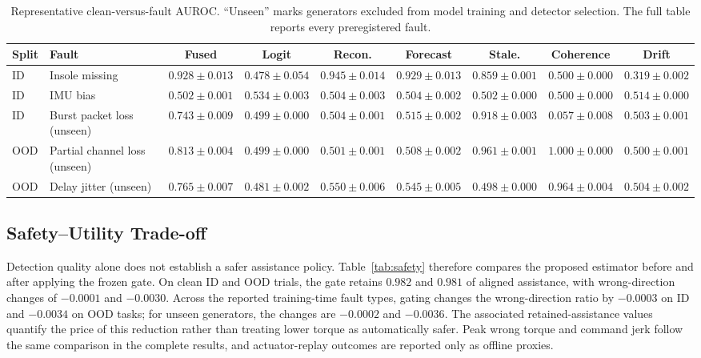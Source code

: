 \documentclass[letterpaper]{article} %
\begin{document}
\begin{table}[t]
\centering
\scriptsize
\setlength{\tabcolsep}{4pt}
\begin{tabular}{llccccccc}
\toprule
Split & Fault & Fused & Logit & Recon. & Forecast & Stale. & Coherence & Drift\\
\midrule
ID  & Insole missing & $0.928\pm0.013$ & $0.478\pm0.054$ & $0.945\pm0.014$ & $0.929\pm0.013$ & $0.859\pm0.001$ & $0.500\pm0.000$ & $0.319\pm0.002$\\
ID  & IMU bias & $0.502\pm0.001$ & $0.534\pm0.003$ & $0.504\pm0.003$ & $0.504\pm0.002$ & $0.502\pm0.000$ & $0.500\pm0.000$ & $0.514\pm0.000$\\
ID  & Burst packet loss (unseen) & $0.743\pm0.009$ & $0.499\pm0.000$ & $0.504\pm0.001$ & $0.515\pm0.002$ & $0.918\pm0.003$ & $0.057\pm0.008$ & $0.503\pm0.001$\\
OOD & Partial channel loss (unseen) & $0.813\pm0.004$ & $0.499\pm0.000$ & $0.501\pm0.001$ & $0.508\pm0.002$ & $0.961\pm0.001$ & $1.000\pm0.000$ & $0.500\pm0.001$\\
OOD & Delay jitter (unseen) & $0.765\pm0.007$ & $0.481\pm0.002$ & $0.550\pm0.006$ & $0.545\pm0.005$ & $0.498\pm0.000$ & $0.964\pm0.004$ & $0.504\pm0.002$\\
\bottomrule
\end{tabular}
\caption{Representative clean-versus-fault AUROC. ``Unseen'' marks generators excluded from model training and detector selection. The full table reports every preregistered fault.}
\label{tab:detection}
\end{table}

\subsection{Safety--Utility Trade-off}

Detection quality alone does not establish a safer assistance policy.
Table~\ref{tab:safety} therefore compares the proposed estimator before and after applying the frozen gate.
On clean ID and OOD trials, the gate retains $0.982$ and $0.981$ of aligned assistance, with wrong-direction changes of $-0.0001$ and $-0.0030$.
Across the reported training-time fault types, gating changes the wrong-direction ratio by $-0.0003$ on ID and $-0.0034$ on OOD tasks; for unseen generators, the changes are $-0.0002$ and $-0.0036$.
The associated retained-assistance values quantify the price of this reduction rather than treating lower torque as automatically safer.
Peak wrong torque and command jerk follow the same comparison in the complete results, and actuator-replay outcomes are reported only as offline proxies.
\end{document}
